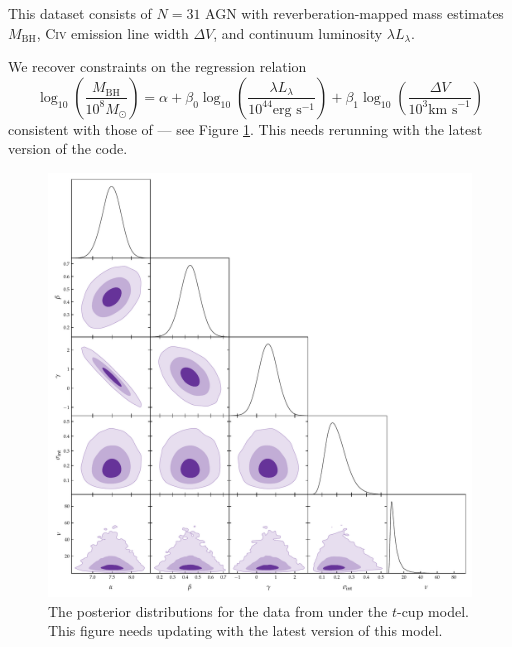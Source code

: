 \documentclass[fleqn,usenatbib]{mnras}
\begin{document}
This dataset consists of $N = 31$ AGN with reverberation-mapped mass estimates
$M_{\text{BH}}$, \textsc{Civ} emission line width $\Delta V$, and continuum
luminosity $\lambda L_{\lambda}$.

We recover constraints on the regression relation
\begin{equation}
    \log_{10} \left( \frac{M_{\text{BH}}}{10^8 M_\odot} \right) =
        \alpha +
        \beta_0 \log_{10} \left( \frac{\lambda L_{\lambda}}{10^{44} \text{erg s}^{-1}} \right) +
        \beta_1 \log_{10} \left( \frac{\Delta V}{10^3 \text{km s}^{-1}} \right)
\end{equation}
consistent with those of \citet{Park:2017} --- see Figure
\ref{fig:real-world.park.corner}. {\color{red} This needs rerunning with the
latest version of the code.}

\begin{figure}
    \includegraphics[width=\columnwidth]{graphics/corner_park.pdf}
    \caption{The posterior distributions for the data from \citet{Park:2007}
    under the $t$-cup model. {\color{red} This figure
    needs updating with the latest version of this model.}}
    \label{fig:real-world.park.corner}
\end{figure}

\end{document}
